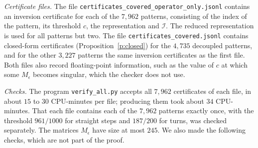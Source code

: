 \emph{Certificate files.} The file \texttt{certificates\_\allowbreak covered\_\allowbreak operator\_\allowbreak only.jsonl} contains an inversion certificate for each of the $7{,}962$ patterns, consisting of the index of the pattern, its threshold $c$, the representation and $\mathcal I$. The reduced representation is used for all patterns but two. The file \texttt{certificates\_\allowbreak covered.jsonl} contains closed-form certificates (Proposition~\ref{p:closed}) for the $4{,}735$ decoupled patterns, and for the other $3{,}227$ patterns the same inversion certificates as the first file. Both files also record floating-point information, such as the value of $c$ at which some $M_\epsilon$ becomes singular, which the checker does not use.

\emph{Checks.} The program \texttt{verify\_all.py} accepts all $7{,}962$ certificates of each file, in about $15$ to $30$ CPU-minutes per file; producing them took about $34$ CPU-minutes. That each file contains each of the $7{,}962$ patterns exactly once, with the threshold $961/1000$ for straight steps and $187/200$ for turns, was checked separately. The matrices $M_\epsilon$ have size at most $245$. We also made the following checks, which are not part of the proof.

